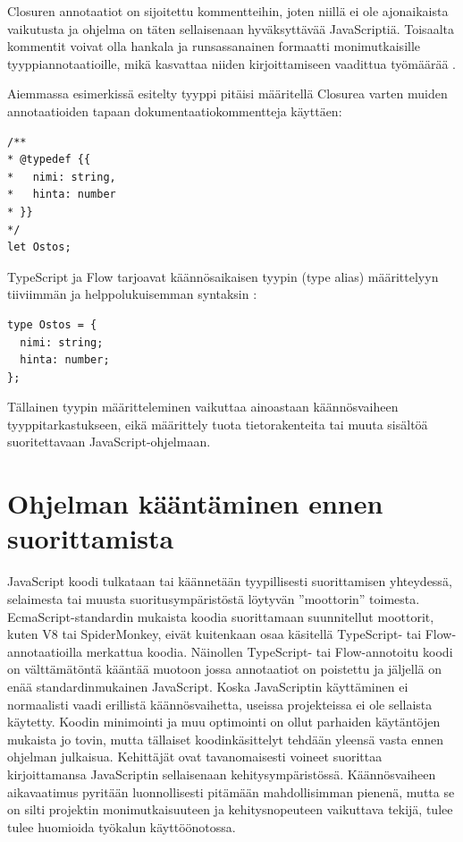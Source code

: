 Closuren annotaatiot on sijoitettu kommentteihin, joten niillä ei ole
ajonaikaista vaikutusta ja ohjelma on täten sellaisenaan hyväksyttävää
JavaScriptiä. Toisaalta kommentit voivat olla hankala ja runsassanainen
formaatti monimutkaisille tyyppiannotaatioille, mikä kasvattaa niiden
kirjoittamiseen vaadittua työmäärää \cite{TypeScriptSpec, TypeScriptatBuild}.

\begin{minipage}{\linewidth}
Aiemmassa esimerkissä esitelty tyyppi  pitäisi
määritellä Closurea varten muiden annotaatioiden tapaan dokumentaatiokommentteja käyttäen:
\begin{lstlisting}[label={lst:closure_typedef}]
/**
* @typedef {{
*   nimi: string,
*   hinta: number
* }}
*/
let Ostos;
\end{lstlisting}
\end{minipage}

TypeScript ja Flow tarjoavat käännösaikaisen tyypin (type alias)
määrittelyyn tiiviimmän ja helppolukuisemman syntaksin \cite{TypeScriptSpec}:

\begin{minipage}{\linewidth}
\begin{lstlisting}[label={lst:ts_flow_type_alias}]
type Ostos = {
  nimi: string;
  hinta: number;
};
\end{lstlisting}
\end{minipage}
Tällainen tyypin määritteleminen vaikuttaa ainoastaan käännösvaiheen
tyyppitarkastukseen, eikä määrittely tuota tietorakenteita tai muuta
sisältöä suoritettavaan JavaScript-ohjelmaan.

\section{Ohjelman kääntäminen ennen suorittamista}

JavaScript koodi tulkataan tai käännetään tyypillisesti suorittamisen
yhteydessä, selaimesta tai muusta suoritusympäristöstä löytyvän ”moottorin”
toimesta. EcmaScript-standardin mukaista koodia suorittamaan suunnitellut
moottorit, kuten V8 tai SpiderMonkey, eivät kuitenkaan osaa käsitellä
TypeScript- tai Flow-annotaatioilla merkattua koodia. Näinollen TypeScript-
tai Flow-annotoitu koodi on välttämätöntä kääntää muotoon jossa
annotaatiot on poistettu ja jäljellä on enää standardinmukainen JavaScript.
Koska JavaScriptin käyttäminen ei normaalisti vaadi erillistä
käännösvaihetta, useissa projekteissa ei ole sellaista käytetty. Koodin
minimointi ja muu optimointi on ollut parhaiden käytäntöjen mukaista jo
tovin, mutta tällaiset koodinkäsittelyt tehdään yleensä vasta ennen ohjelman
julkaisua. Kehittäjät ovat tavanomaisesti voineet suorittaa kirjoittamansa
JavaScriptin sellaisenaan kehitysympäristössä. Käännösvaiheen aikavaatimus
pyritään luonnollisesti pitämään mahdollisimman pienenä, mutta se on silti
projektin monimutkaisuuteen ja kehitysnopeuteen vaikuttava tekijä, tulee
tulee huomioida työkalun käyttöönotossa.

